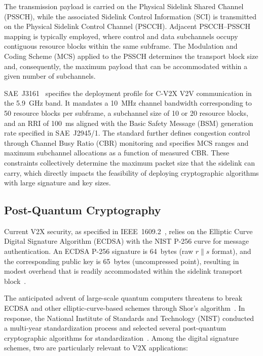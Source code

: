 \documentclass[letterpaper,journal]{IEEEtran}
\begin{document}
The transmission payload is carried on the Physical Sidelink Shared Channel (PSSCH), while the associated Sidelink Control Information (SCI) is transmitted on the Physical Sidelink Control Channel (PSCCH). Adjacent PSCCH--PSSCH mapping is typically employed, where control and data subchannels occupy contiguous resource blocks within the same subframe. The Modulation and Coding Scheme (MCS) applied to the PSSCH determines the transport block size and, consequently, the maximum payload that can be accommodated within a given number of subchannels.

SAE~J3161~\cite{sae_j3161} specifies the deployment profile for C-V2X V2V communication in the 5.9~GHz band. It mandates a 10~MHz channel bandwidth corresponding to 50 resource blocks per subframe, a subchannel size of 10 or 20 resource blocks, and an RRI of 100~ms aligned with the Basic Safety Message (BSM) generation rate specified in SAE~J2945/1. The standard further defines congestion control through Channel Busy Ratio (CBR) monitoring and specifies MCS ranges and maximum subchannel allocations as a function of measured CBR. These constraints collectively determine the maximum packet size that the sidelink can carry, which directly impacts the feasibility of deploying cryptographic algorithms with large signature and key sizes.

\subsection{Post-Quantum Cryptography}
\label{sec:pqc}

Current V2X security, as specified in IEEE~1609.2~\cite{ieee_16092}, relies on the Elliptic Curve Digital Signature Algorithm (ECDSA) with the NIST P-256 curve for message authentication. An ECDSA P-256 signature is 64~bytes (raw $r \| s$ format), and the corresponding public key is 65~bytes (uncompressed point), resulting in modest overhead that is readily accommodated within the sidelink transport block~\cite{ieee_16092}.

The anticipated advent of large-scale quantum computers threatens to break ECDSA and other elliptic-curve-based schemes through Shor's algorithm~\cite{shor1994algorithms}. In response, the National Institute of Standards and Technology (NIST) conducted a multi-year standardization process and selected several post-quantum cryptographic algorithms for standardization~\cite{nist_pqc_report}. Among the digital signature schemes, two are particularly relevant to V2X applications:
\end{document}
